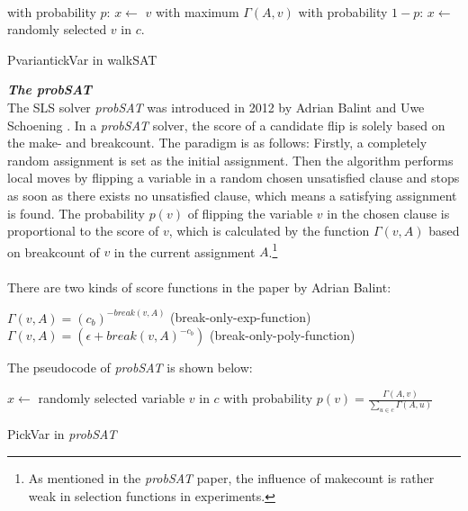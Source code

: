 \documentclass[12pt,a4paper,twoside]{scrartcl}
\numberwithin{equation}{section}
\begin{document}
\\
\begin{algorithm}[H]
  with probability $p$: $x \leftarrow$   $v$ with maximum $\Gamma(A,v)$ \;
  with probability $1-p$:  $x \leftarrow$  randomly selected $v$ in $c$. 
 \caption{PvariantickVar in walkSAT}
\end{algorithm}  

\emph{\textbf{The probSAT}}\\
The SLS solver \emph{probSAT} was introduced in 2012 by Adrian Balint and Uwe Schoening \cite{balint2016engineering}. In a \emph{probSAT} solver, the score of a candidate flip is solely based on the make- and breakcount. The paradigm is as follows: Firstly, a completely random assignment is set as the initial assignment. Then the algorithm performs local moves by flipping a variable in a random chosen unsatisfied clause and stops as soon as there exists no unsatisfied clause, which means a satisfying assignment is found. The probability $p(v)$ of flipping the variable $v$ in the chosen clause is proportional to the score of $v$, which is calculated by the function $\Gamma(v,A)$ based on breakcount of $v$ in the current assignment $A$.\footnote{As mentioned in the \emph{probSAT} paper, the influence of makecount is rather weak in selection functions in experiments.} 
\\
 \\ There are two kinds of score functions in the paper by Adrian Balint: \\
\begin{center}
$\Gamma(v,A) = (c_b)^{-break(v,A)}$ (break-only-exp-function) \\
$\Gamma(v,A)=(\epsilon +break(v,A)^{-c_b})$  (break-only-poly-function)\\
\end{center} 
\clearpage
The pseudocode of \emph{probSAT} is shown below:\\
\begin{algorithm}[H]
  $x \leftarrow$ randomly selected  variable $v$ in $c$ with probability $p(v) =\frac{\Gamma(A,v)}{\sum_{u \in c}\Gamma(A,u)}$ 
 \caption{PickVar in \emph{probSAT}}
\end{algorithm} 
\end{document}
